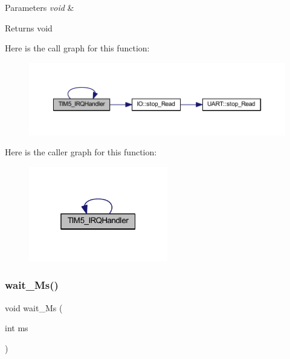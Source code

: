 \begin{DoxyParams}{Parameters}
{\em void} & \\
\hline
\end{DoxyParams}
\begin{DoxyReturn}{Returns}
void 
\end{DoxyReturn}
Here is the call graph for this function\+:\nopagebreak
\begin{figure}[H]
\begin{center}
\leavevmode
\includegraphics[width=350pt]{namespace_l_l_a5e66446caf21dd90191dc07a13ce2378_cgraph}
\end{center}
\end{figure}
Here is the caller graph for this function\+:\nopagebreak
\begin{figure}[H]
\begin{center}
\leavevmode
\includegraphics[width=172pt]{namespace_l_l_a5e66446caf21dd90191dc07a13ce2378_icgraph}
\end{center}
\end{figure}
\mbox{\label{namespace_l_l_ab30bdedb41438098df71bea7d5eb624d}} 
\subsubsection{\texorpdfstring{wait\+\_\+\+Ms()}{wait\_Ms()}}
{\footnotesize\ttfamily void wait\+\_\+\+Ms (\begin{DoxyParamCaption}\item[{int}]{ms }\end{DoxyParamCaption})}



